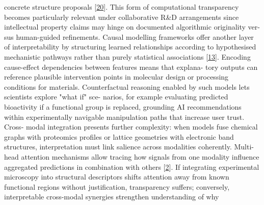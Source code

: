 \documentclass[
]{article}
\begin{document}
concrete structure proposals {[}\protect\hyperlink{_bookmark60}{20}{]}.
This form of computational transparency becomes particularly relevant
under collaborative R\&D arrangements since intellectual property claims
may hinge on documented algorithmic originality ver- sus human-guided
refinements. Causal modelling frameworks offer another layer of
interpretability by structuring learned relationships according to
hypothesised mechanistic pathways rather than purely statistical
associations {[}\protect\hyperlink{_bookmark53}{13}{]}. Encoding
cause-effect dependencies between features means that explana- tory
outputs can reference plausible intervention points in molecular design
or processing conditions for materials. Counterfactual reasoning enabled
by such models lets scientists explore "what if" sce- narios, for
example evaluating predicted bioactivity if a functional group is
replaced, grounding AI recommendations within experimentally navigable
manipulation paths that increase user trust. Cross- modal integration
presents further complexity: when models fuse chemical graphs with
proteomics profiles or lattice geometries with electronic band
structures, interpretation must link salience across modalities
coherently. Multi-head attention mechanisms allow tracing how signals
from one modality influence aggregated predictions in combination with
others {[}\protect\hyperlink{_bookmark42}{2}{]}. If integrating
experimental microscopy into structural descriptors shifts attention
away from known functional regions without justification, transparency
suffers; conversely, interpretable cross-modal synergies strengthen
understanding of why
\end{document}
